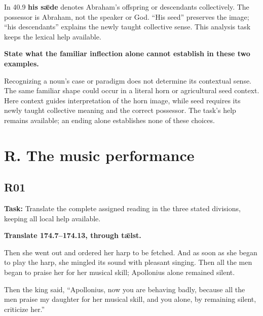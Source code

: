 In 40.9 \textbf{his sǣde} denotes Abraham's offspring or descendants collectively. The possessor is Abraham, not the speaker or God. “His seed” preserves the image; “his descendants” explains the newly taught collective sense. This analysis task keeps the lexical help available.

\textbf{State what the familiar inflection alone cannot establish in these two examples.}

Recognizing a noun's case or paradigm does not determine its contextual sense. The same familiar shape could occur in a literal horn or agricultural seed context. Here context guides interpretation of the horn image, while seed requires its newly taught collective meaning and the correct possessor. The task's help remains available; an ending alone establishes none of these choices.

\clearpage
\section*{R. The music performance}

\subsection*{R01}

\textbf{Task:} Translate the complete assigned reading in the three stated divisions, keeping all local help available.

\textbf{Translate 174.7–174.13, through tǣlst.}

Then she went out and ordered her harp to be fetched. And as soon as she began to play the harp, she mingled its sound with pleasant singing. Then all the men began to praise her for her musical skill; Apollonius alone remained silent.

Then the king said, “Apollonius, now you are behaving badly, because all the men praise my daughter for her musical skill, and you alone, by remaining silent, criticize her.”

